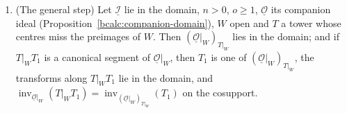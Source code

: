 \begin{lemma}
\begin{enumerate}
\(\underline{\mathcal S}_1\) lies in the domain, \(T_1\) is a canonical segment of it, its transforms along \(T_1\) lie in the domain, and
\(\operatorname{inv}_{\underline{\mathcal S}_0}(T|_WT_1)=\operatorname{inv}_{\underline{\mathcal S}_1}(T_1)\) on the cosupport.
\item (The general step) Let \(\underline{\mathcal I}\) lie in the domain, \(n>0\), \(o\ge1\), \(\underline{\mathcal O}\) its companion ideal (Proposition~\ref{bcalc:companion-domain}),
\(W\) open and \(T\) a tower whose centres miss the preimages of \(W\). Then \((\underline{\mathcal O}|_W)_{T|_W}\) lies in the domain; and if \(T|_WT_1\) is a canonical
segment of \(\underline{\mathcal O}|_W\), then \(T_1\) is one of \((\underline{\mathcal O}|_W)_{T|_W}\), the transforms along \(T|_WT_1\) lie in the domain, and
\(\operatorname{inv}_{\underline{\mathcal O}|_W}(T|_WT_1)=\operatorname{inv}_{(\underline{\mathcal O}|_W)_{T|_W}}(T_1)\) on the cosupport.
\end{enumerate}
\end{lemma}
